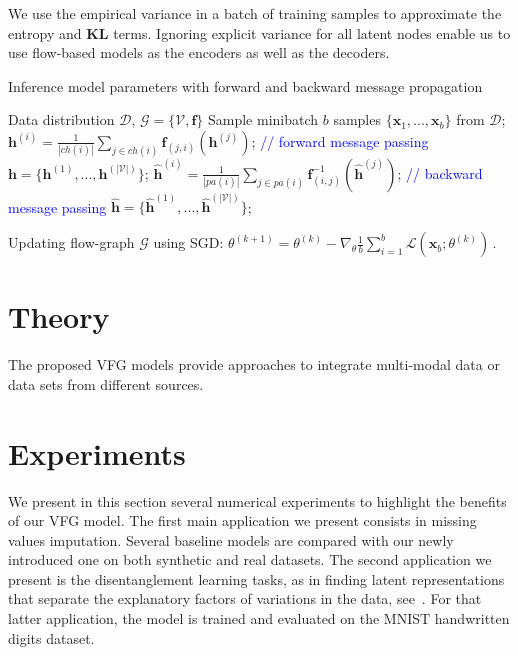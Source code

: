 \documentclass{article} %
\newcommand{\belhal}[1]{{\color{red}{\bf\sf [BK: #1]}}}
\begin{document}
\belhal{To Improve. We should add a paragraph on implementation and ELBO/gradient computation} 
We use the empirical variance in a batch of training samples to approximate the entropy and \textbf{KL} terms. 
\belhal{KL  term between Gaussian priors is tractable, why do we approximate it?}
Ignoring  explicit variance  for all latent nodes enable us to use flow-based models as the encoders as well as the decoders. 





\begin{algorithm}[H]
   \caption{Inference model parameters with  forward and backward message propagation}
   \label{alg:main}
\begin{algorithmic}[1]
    Data distribution $\mathcal{D}$,  $\mathcal{G} = \{\mathcal{V}, \mathbf{f}\}$
   \STATE  Sample minibatch $b$ samples $\{\mathbf{x}_1, ..., \mathbf{x}_b \}$ from $\mathcal{D}$;
   \STATE $\mathbf{h}^{(i)} = \frac{1}{|ch(i)|} \sum_{j \in ch(i) } \mathbf{f}_{(j,i)}(\mathbf{h}^{(j)})$; \label{line:forward} \textcolor{blue}{// forward message passing}
   \ENDFOR
    \STATE  $\mathbf{h} =  \{\mathbf{h}^{(1)}, ...,  \mathbf{h}^{(|\mathcal{V}|)}  \}$;
   \STATE $\widehat{\mathbf{h}}^{(i)} = \frac{1}{|pa(i)|} \sum_{j \in pa(i) } \mathbf{f}^{-1}_{ (i,j)}(\widehat{\mathbf{h}}^{(j)}) $;\label{line:backward}  \textcolor{blue}{// backward message passing}
   \ENDFOR
    \STATE  $ \widehat{\mathbf{h}} =  \{\widehat{\mathbf{h}}^{(1)}, ...,  \widehat{\mathbf{h}}^{(|\mathcal{V}|)}  \}$;
    
    \STATE Updating flow-graph $\mathcal{G}$ using SGD: $\theta^{(k+1)} = \theta^{(k)} -  \nabla_{\theta}\frac{1}{b} \sum_{i=1}^b  \mathcal{L}(\mathbf{x}_b; \theta^{(k)})   \, .$
   \ENDFOR
\end{algorithmic}
\end{algorithm}




\section{Theory}\label{sec:theory}
The proposed VFG models provide approaches to integrate multi-modal data or data sets from different sources. 

\section{Experiments}\label{sec:numerical}
We present in this section several numerical experiments to highlight the benefits of our VFG model.
The first main application we present consists in missing values imputation. Several baseline models are compared with our newly introduced one on both synthetic and real datasets.
The second application we present is the disentanglement learning tasks, as in finding latent representations that separate the explanatory factors of variations in the data, see~\citep{bengio2013representation}.
For that latter application, the model is trained and evaluated on the MNIST handwritten digits dataset.
\end{document}
